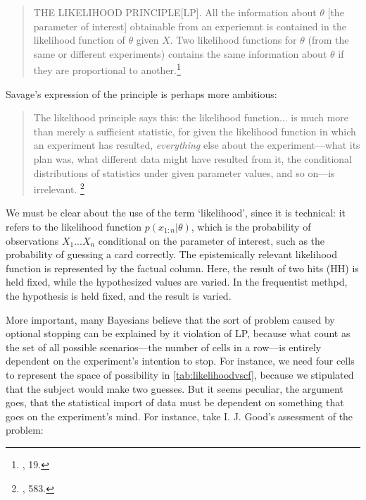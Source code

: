 \begin{quote}
THE LIKELIHOOD PRINCIPLE[LP]. All the information about $\theta$ [the parameter of interest] obtainable from an experiemnt is contained in the likelihood function of $\theta$ given $X$. Two likelihood functions for $\theta$ (from the same or different experiments) contains the same information about $\theta$ if they are proportional to another.\footnote{\cite{lp}, 19.}	
\end{quote}


Savage's expression of the principle is perhaps more ambitious:

\begin{quote}
The likelihood principle says this: the likelihood function... is much more than merely a sufficient statistic, for given the likelihood function in which an experiment has resulted, \emph{everything} else about the experiment---what its plan was, what different data might have resulted from it, the conditional distributions of statistics under given parameter values, and so on---is irrelevant. \footnote{\cite{savagerecon}, 583.}	
\end{quote}


We must be clear about the use of the term `likelihood', since it is technical: it refers to the likelihood function \(p(x_{1:n}|\theta)\), which is the probability of
observations \(X_1...X_n\) conditional on the parameter of interest,
such as the probability of guessing a card correctly. The epistemically relevant likelihood function is represented by the factual column. Here, the result of two hits (HH) is held fixed, while the hypothesized values are varied. In the frequentist methpd, the hypothesis is held fixed, and the result is varied.


More important, many Bayesians believe that the sort of problem caused by
optional stopping can be explained by it violation of LP, because what count as the set of all possible scenarios---the number of cells in a row---is entirely dependent on the experiment's intention to stop. For instance, we need four cells to represent the space of possibility in \ref{tab:likelihoodvscf}, because we stipulated that the subject would make two guesses. But it seems peculiar, the argument goes, that the statistical import of data must be dependent on something that goes on the experiment's mind. For instance, take I. J. Good's assessment of the problem:

